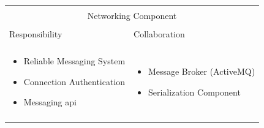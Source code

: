 \noindent
\begin{tabular}{|l|l|}
    \cline{1-2}
    \multicolumn{2}{|c|}{} \\[-0.3cm]
    \multicolumn{2}{|c|}{Networking Component} \\ 
    \multicolumn{2}{|c|}{} \\[-0.3cm]
    \cline{1-2}
    Responsibility & Collaboration \\
    \cline{1-2}
    & \\[-0.2cm]
    \begin{minipage}{0.47\textwidth}
        \begin{itemize}
          \item Reliable Messaging System
          \item Connection Authentication
          \item Messaging \gls{api}
        \end{itemize} 
    \end{minipage}
	&
    \begin{minipage}{0.47\textwidth}
        \begin{itemize}
          \item Message Broker (ActiveMQ)
          \item Serialization Component
        \end{itemize} 
    \end{minipage}
	\\ & \\
    \hline
\end{tabular}

